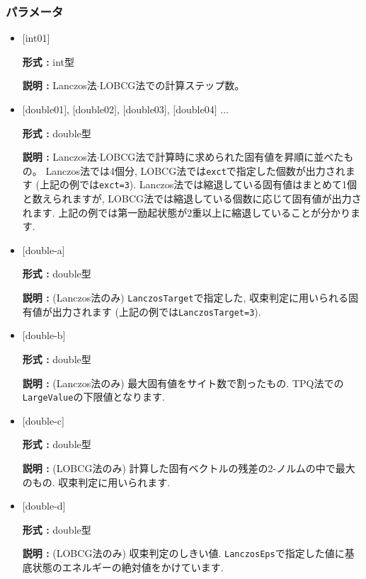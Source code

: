 \subsubsection{パラメータ}
\begin{itemize}

\item  $[$int01$]$
  
 {\bf 形式 :} int型

 {\bf 説明 :} Lanczos法$\cdot$LOBCG法での計算ステップ数。
 
\item  $[$double01$]$, $[$double02$]$, $[$double03$]$, $[$double04$]$ ...

  {\bf 形式 :} double型 
  
  {\bf 説明 :} Lanczos法$\cdot$LOBCG法で計算時に求められた固有値を昇順に並べたもの。
  Lanczos法では4個分,
  LOBCG法では\verb|exct|で指定した個数が出力されます (上記の例では\verb|exct=3|).
  Lanczos法では縮退している固有値はまとめて1個と数えられますが,
  LOBCG法では縮退している個数に応じて固有値が出力されます.
  上記の例では第一励起状態が2重以上に縮退していることが分かります.

\item $[$double-a$]$

  {\bf 形式 :} double型 
  
  {\bf 説明 :} (Lanczos法のみ) \verb|LanczosTarget|で指定した,
  収束判定に用いられる固有値が出力されます (上記の例では\verb|LanczosTarget=3|).

\item $[$double-b$]$

  {\bf 形式 :} double型 
  
  {\bf 説明 :} (Lanczos法のみ) 最大固有値をサイト数で割ったもの.
  TPQ法での\verb|LargeValue|の下限値となります.

\item $[$double-c$]$

  {\bf 形式 :} double型 
  
  {\bf 説明 :} (LOBCG法のみ) 計算した固有ベクトルの残差の2-ノルムの中で最大のもの.
  収束判定に用いられます.

\item $[$double-d$]$

  {\bf 形式 :} double型 
  
  {\bf 説明 :} (LOBCG法のみ) 収束判定のしきい値.
  \verb|LanczosEps|で指定した値に基底状態のエネルギーの絶対値をかけています.

\end{itemize}

